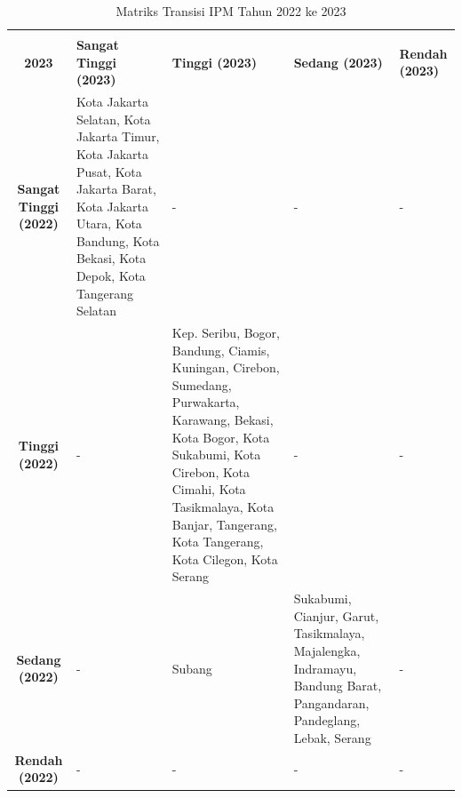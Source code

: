 \begin{table}[H]
\centering
\caption{Matriks Transisi IPM Tahun 2022 ke 2023} \label{tab:ipm_transisi_2022_2023}
\begin{tabular}{|c|p{2cm}|p{2cm}|p{2cm}|p{2cm}|}
\hline
\makecell{\textbf{Tahun 2022} \\ \textbf{2023}} & \textbf{Sangat Tinggi (2023)} & \textbf{Tinggi (2023)} & \textbf{Sedang (2023)} & \textbf{Rendah (2023)} \\ \hline
\textbf{Sangat Tinggi (2022)} & Kota Jakarta Selatan, Kota Jakarta Timur, Kota Jakarta Pusat, Kota Jakarta Barat, Kota Jakarta Utara, Kota Bandung, Kota Bekasi, Kota Depok, Kota Tangerang Selatan & - & - & - \\ \hline
\textbf{Tinggi (2022)} & - & Kep. Seribu, Bogor, Bandung, Ciamis, Kuningan, Cirebon, Sumedang, Purwakarta, Karawang, Bekasi, Kota Bogor, Kota Sukabumi, Kota Cirebon, Kota Cimahi, Kota Tasikmalaya, Kota Banjar, Tangerang, Kota Tangerang, Kota Cilegon, Kota Serang & - & - \\ \hline
\textbf{Sedang (2022)} & - & Subang & Sukabumi, Cianjur, Garut, Tasikmalaya, Majalengka, Indramayu, Bandung Barat, Pangandaran, Pandeglang, Lebak, Serang & - \\ \hline
\textbf{Rendah (2022)} & - & - & - & - \\ \hline
\end{tabular}
\end{table}